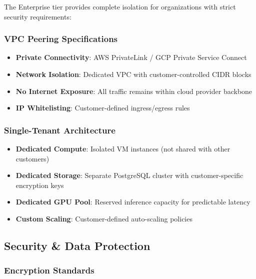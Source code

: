 The Enterprise tier provides complete isolation for organizations with strict security requirements:

\subsubsection{VPC Peering Specifications}


\begin{itemize}[noitemsep]
    \item \textbf{Private Connectivity}: AWS PrivateLink / GCP Private Service Connect
    \item \textbf{Network Isolation}: Dedicated VPC with customer-controlled CIDR blocks
    \item \textbf{No Internet Exposure}: All traffic remains within cloud provider backbone
    \item \textbf{IP Whitelisting}: Customer-defined ingress/egress rules
\end{itemize}

\subsubsection{Single-Tenant Architecture}

\begin{itemize}[noitemsep]
    \item \textbf{Dedicated Compute}: Isolated VM instances (not shared with other customers)
    \item \textbf{Dedicated Storage}: Separate PostgreSQL cluster with customer-specific encryption keys
    \item \textbf{Dedicated GPU Pool}: Reserved inference capacity for predictable latency
    \item \textbf{Custom Scaling}: Customer-defined auto-scaling policies
\end{itemize}

\subsection{Security \& Data Protection}

\subsubsection{Encryption Standards}

